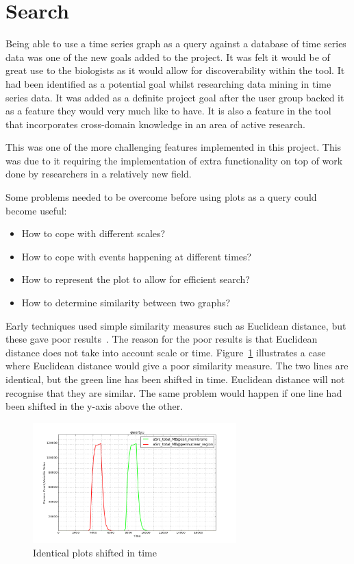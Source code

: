 \section{Search}
\label{sec:search}

Being able to use a time series graph as a query against a database of time series data was one of the new goals added to the project.  It was felt it would be of great use to the biologists as it would allow for discoverability within the tool.  It had been identified as a potential goal whilst researching data mining in time series data.  It was added as a definite project goal after the user group backed it as a feature they would very much like to have.  It is also a feature in the tool that incorporates cross-domain knowledge in an area of active research.

This was one of the more challenging features implemented in this project.  This was due to it requiring the implementation of extra functionality on top of work done by researchers in a relatively new field.

Some problems needed to be overcome before using plots as a query could become useful:
\begin{itemize}
\item How to cope with different scales?
\item How to cope with events happening at different times?
\item How to represent the plot to allow for efficient search?
\item How to determine similarity between two graphs?
\end{itemize}

Early techniques used simple similarity measures such as Euclidean distance, but these gave poor results~\cite{chotirat}.  The reason for the poor results is that Euclidean distance does not take into account scale or time.  Figure~\ref{fig:similar} illustrates a case where Euclidean distance would give a poor similarity measure.  The two lines are identical, but the green line has been shifted in time.  Euclidean distance will not recognise that they are similar.  The same problem would happen if one line had been shifted in the y-axis above the other.

\begin{figure}[h!]
    \centering
    \includegraphics[width=0.7\textwidth]{images/similar_plots.png}
    \caption{Identical plots shifted in time}
    \label{fig:similar}
\end{figure}


